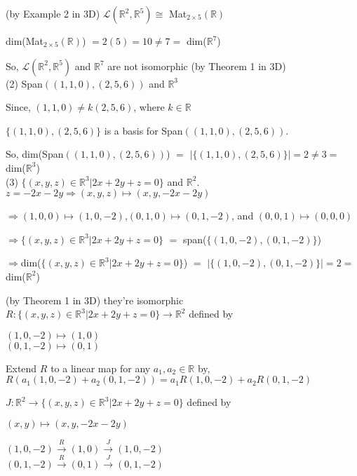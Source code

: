 \documentclass{article}
\begin{document}
(by Example 2 in 3D) $\mathcal{L}(\mathbb{R}^2 , \mathbb{R}^5) \cong$
Mat$_{2\times5}(\mathbb{R})$

dim(Mat$_{2\times5}(\mathbb{R})$) $= 2(5) = 10 \neq 7 =$
dim($\mathbb{R}^7$)

So, $\mathcal{L}(\mathbb{R}^2 , \mathbb{R}^5)$ and $\mathbb{R}^7$ are
not isomorphic (by Theorem 1 in 3D)\\

(2) Span$((1, 1, 0), (2, 5, 6))$ and $\mathbb{R}^3$

Since, $(1,1,0) \neq k(2,5,6)$, where $k \in \mathbb{R}$

$\{(1,1,0),(2,5,6)\}$ is a basis for Span$((1, 1, 0), (2, 5, 6))$.

So, dim(Span$((1, 1, 0), (2, 5, 6))$) $=$ $|\{(1,1,0),(2,5,6)\}| = 2
\neq 3 =$ dim($\mathbb{R}^3$)\\

\newpage
(3) $\{(x, y, z) ∈ \mathbb{R}^3 | 2x + 2y + z = 0\}$ and
$\mathbb{R}^2.$\\

$z=-2x-2y \Rightarrow (x,y,z) \mapsto (x,y,-2x-2y)$

$\Rightarrow (1,0,0) \mapsto (1,0,-2)$,$ (0,1,0) \mapsto (0,1,-2)$, and
$(0,0,1) \mapsto (0,0,0)$

$\Rightarrow$$\{(x, y, z) ∈ \mathbb{R}^3 | 2x + 2y + z = 0\}$ $=$
span($\{(1,0,-2),(0,1,-2)\}$)

$\Rightarrow$dim($\{(x, y, z) ∈ \mathbb{R}^3 | 2x + 2y + z = 0\}$) $=$
$|\{(1,0,-2),(0,1,-2)\}| = 2 =$ dim($\mathbb{R}^2$)

(by Theorem 1 in 3D) they're isomorphic\\


$R: \{(x, y, z) ∈ \mathbb{R}^3 | 2x + 2y + z = 0\} \rightarrow
\mathbb{R}^2$ defined by

$(1,0,-2) \mapsto(1,0)$\\
$(0,1,-2) \mapsto(0,1)$

Extend $R$ to a linear map for any $a_1,a_2 \in \mathbb{R}$ by,\\
$R(a_1(1,0,-2)+a_2(0,1,-2))= a_1R(1,0,-2)+a_2R(0,1,-2)$

$J:\mathbb{R}^2\rightarrow \{(x, y, z) ∈ \mathbb{R}^3 | 2x + 2y + z = 0\}
$ defined by

$(x,y) \mapsto (x,y,-2x-2y)$


$(1,0,-2) \stackrel{R}{\rightarrow} (1,0) \stackrel{J}{\rightarrow}
(1,0,-2) $\\
$(0,1,-2) \stackrel{R}{\rightarrow} (0,1) \stackrel{J}{\rightarrow} (0,1,-2) $
\end{document}
